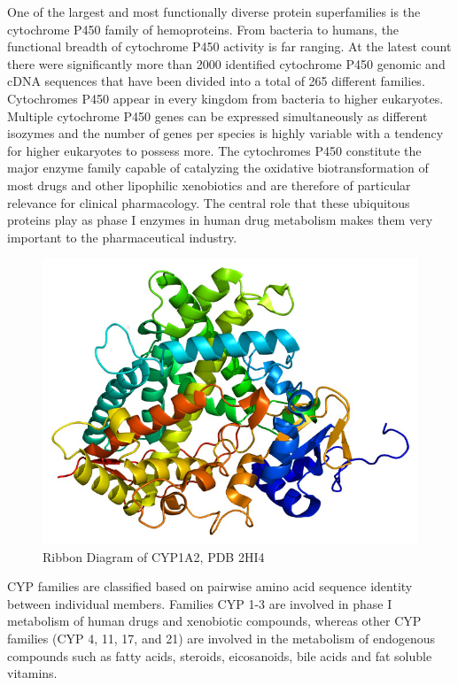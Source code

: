 One of the largest and most functionally diverse protein superfamilies is the cytochrome P450 family of hemoproteins. From bacteria to humans, the functional breadth of cytochrome P450 activity is far ranging. At the latest count there were significantly more than 2000 identified cytochrome P450 genomic and cDNA sequences that have been divided into a total of 265 different families. \cite{Danielson2002} Cytochromes P450 appear in every kingdom from bacteria to higher eukaryotes. Multiple cytochrome P450 genes can be expressed simultaneously as different isozymes and the number of genes per species is highly variable with a tendency for higher eukaryotes to possess more. The cytochromes P450  constitute the major enzyme family capable of catalyzing the oxidative biotransformation of most drugs and other lipophilic xenobiotics and are therefore of particular relevance for clinical pharmacology. The central role that these ubiquitous proteins play as phase I enzymes in human drug metabolism makes them very important to the pharmaceutical industry.

\begin{figure}[H]
  \centering
   \includegraphics[width=1\textwidth]{../img/CYP1A2_PDB.jpg}
  \caption{Ribbon Diagram of CYP1A2, PDB 2HI4}
\end{figure}

CYP families are classified based on pairwise amino acid sequence identity between individual members. Families CYP 1-3 are involved in phase I metabolism of human drugs and xenobiotic compounds, whereas other CYP families (CYP 4, 11, 17, and 21) are involved in the metabolism of endogenous compounds such as fatty acids, steroids, eicosanoids, bile acids and fat soluble vitamins. \cite{Singh2011}

